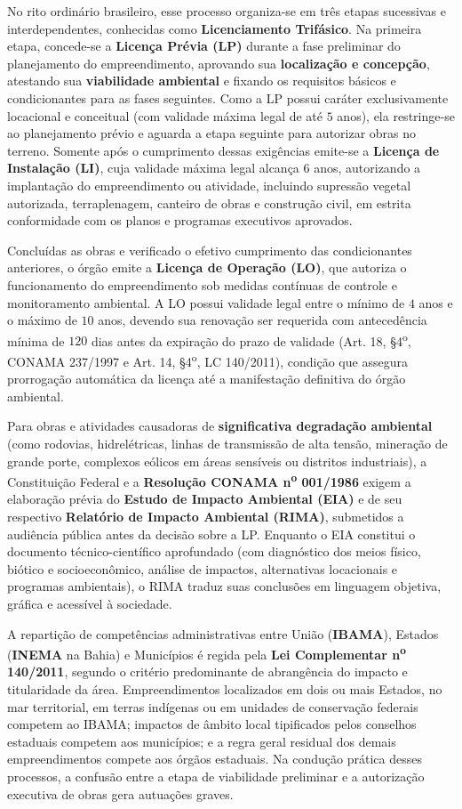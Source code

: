 No rito ordinário brasileiro, esse processo organiza-se em três etapas sucessivas e interdependentes, conhecidas como \textbf{Licenciamento Trifásico}. Na primeira etapa, concede-se a \textbf{Licença Prévia (LP)} durante a fase preliminar do planejamento do empreendimento, aprovando sua \textbf{localização e concepção}, atestando sua \textbf{viabilidade ambiental} e fixando os requisitos básicos e condicionantes para as fases seguintes. Como a LP possui caráter exclusivamente locacional e conceitual (com validade máxima legal de até $5$ anos), ela restringe-se ao planejamento prévio e aguarda a etapa seguinte para autorizar obras no terreno. Somente após o cumprimento dessas exigências emite-se a \textbf{Licença de Instalação (LI)}, cuja validade máxima legal alcança $6$ anos, autorizando a implantação do empreendimento ou atividade, incluindo supressão vegetal autorizada, terraplenagem, canteiro de obras e construção civil, em estrita conformidade com os planos e programas executivos aprovados.

Concluídas as obras e verificado o efetivo cumprimento das condicionantes anteriores, o órgão emite a \textbf{Licença de Operação (LO)}, que autoriza o funcionamento do empreendimento sob medidas contínuas de controle e monitoramento ambiental. A LO possui validade legal entre o mínimo de $4$ anos e o máximo de $10$ anos, devendo sua renovação ser requerida com antecedência mínima de $120$ dias antes da expiração do prazo de validade (Art. 18, \S 4\textsuperscript{o}, CONAMA 237/1997 e Art. 14, \S 4\textsuperscript{o}, LC 140/2011), condição que assegura prorrogação automática da licença até a manifestação definitiva do órgão ambiental.

Para obras e atividades causadoras de \textbf{significativa degradação ambiental} (como rodovias, hidrelétricas, linhas de transmissão de alta tensão, mineração de grande porte, complexos eólicos em áreas sensíveis ou distritos industriais), a Constituição Federal e a \textbf{Resolução CONAMA n\textsuperscript{o} 001/1986} exigem a elaboração prévia do \textbf{Estudo de Impacto Ambiental (EIA)} e de seu respectivo \textbf{Relatório de Impacto Ambiental (RIMA)}, submetidos a audiência pública antes da decisão sobre a LP. Enquanto o EIA constitui o documento técnico-científico aprofundado (com diagnóstico dos meios físico, biótico e socioeconômico, análise de impactos, alternativas locacionais e programas ambientais), o RIMA traduz suas conclusões em linguagem objetiva, gráfica e acessível à sociedade.

A repartição de competências administrativas entre União (\textbf{IBAMA}), Estados (\textbf{INEMA} na Bahia) e Municípios é regida pela \textbf{Lei Complementar n\textsuperscript{o} 140/2011}, segundo o critério predominante de abrangência do impacto e titularidade da área. Empreendimentos localizados em dois ou mais Estados, no mar territorial, em terras indígenas ou em unidades de conservação federais competem ao IBAMA; impactos de âmbito local tipificados pelos conselhos estaduais competem aos municípios; e a regra geral residual dos demais empreendimentos compete aos órgãos estaduais. Na condução prática desses processos, a confusão entre a etapa de viabilidade preliminar e a autorização executiva de obras gera autuações graves.

